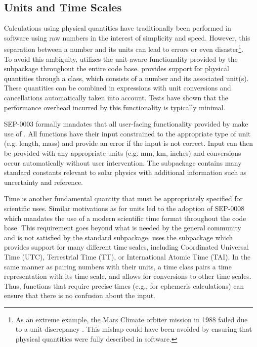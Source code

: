 \subsection{Units and Time Scales}
\label{sec:units}

Calculations using physical quantities have traditionally been performed in software using raw numbers in the interest of simplicity and speed.
However, this separation between a number and its units can lead to errors or even disaster\footnote{As an extreme example, the Mars Climate orbiter mission in 1988 failed due to a unit discrepancy \citep{mco_mishap_report}.
This mishap could have been avoided by ensuring that physical quantities were fully described in software.}.
To avoid this ambiguity, \sunpypkg utilizes the unit-aware functionality provided by the  subpackage throughout the entire code base.
 provides support for physical quantities through a  class, which consists of a number and its associated unit(s).
These quantities can be combined in expressions with unit conversions and cancellations automatically taken into account.
Tests have shown that the performance overhead incurred by this functionality is typically minimal.

SEP-0003 \citep{sep-0003} formally mandates that all user-facing functionality provided by \sunpypkg make use of .
All functions have their input constrained to the appropriate type of unit (e.g. length, mass) and provide an error if the input is not correct.
Input can then be provided with any appropriate units (e.g. mm, km, inches) and conversions occur automatically without user intervention.
The  subpackage contains many standard constants relevant to solar physics with additional information such as uncertainty and reference.

Time is another fundamental quantity that must be appropriately specified for scientific uses.
Similar motivations as for units led to the adoption of SEP-0008 \citep{sep-0008} which mandates the use of a modern scientific time format throughout the \sunpypkg code base.
This requirement goes beyond what is needed by the general \python community and is not satisfied by the standard  subpackage.
\sunpypkg uses the  subpackage which provides support for many different time scales, including Coordinated Universal Time (UTC), Terrestrial Time (TT), or International Atomic Time (TAI).
In the same manner as pairing numbers with their units, a time class pairs a time representation with its time scale, and allows for conversions to other time scales.
Thus, functions that require precise times (e.g., for ephemeris calculations) can ensure that there is no confusion about the input.
